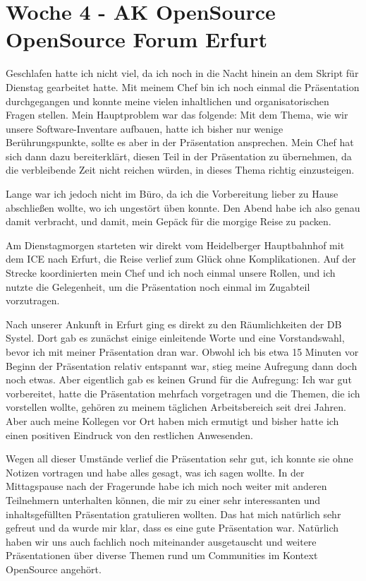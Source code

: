 \section{Woche 4 - AK OpenSource \headerand OpenSource Forum Erfurt} \label{sec:bericht-wo-4}


Geschlafen hatte ich nicht viel, da ich noch in die Nacht hinein an dem Skript für Dienstag gearbeitet hatte.
Mit meinem Chef bin ich noch einmal die Präsentation durchgegangen und konnte meine vielen inhaltlichen und organisatorischen Fragen stellen.
Mein Hauptproblem war das folgende: Mit dem Thema, wie wir unsere Software-Inventare aufbauen, hatte ich bisher nur wenige Berührungspunkte, sollte es aber in der Präsentation ansprechen.
Mein Chef hat sich dann dazu bereiterklärt, diesen Teil in der Präsentation zu übernehmen, da die verbleibende Zeit nicht reichen würden, in dieses Thema richtig einzusteigen.

Lange war ich jedoch nicht im Büro, da ich die Vorbereitung lieber zu Hause abschließen wollte, wo ich ungestört üben konnte.
Den Abend habe ich also genau damit verbracht, und damit, mein Gepäck für die morgige Reise zu packen.

Am Dienstagmorgen starteten wir direkt vom Heidelberger Hauptbahnhof mit dem ICE nach Erfurt, die Reise verlief zum Glück ohne Komplikationen.
Auf der Strecke koordinierten mein Chef und ich noch einmal unsere Rollen, und ich nutzte die Gelegenheit, um die Präsentation noch einmal im Zugabteil vorzutragen.

Nach unserer Ankunft in Erfurt ging es direkt zu den Räumlichkeiten der DB Systel.
Dort gab es zunächst einige einleitende Worte und eine Vorstandswahl, bevor ich mit meiner Präsentation dran war.
Obwohl ich bis etwa 15 Minuten vor Beginn der Präsentation relativ entspannt war, stieg meine Aufregung dann doch noch etwas.
Aber eigentlich gab es keinen Grund für die Aufregung:
Ich war gut vorbereitet, hatte die Präsentation mehrfach vorgetragen und die Themen, die ich vorstellen wollte, gehören zu meinem täglichen Arbeitsbereich seit drei Jahren.
Aber auch meine Kollegen vor Ort haben mich ermutigt und bisher hatte ich einen positiven Eindruck von den restlichen Anwesenden.

Wegen all dieser Umstände verlief die Präsentation sehr gut, ich konnte sie ohne Notizen vortragen und habe alles gesagt, was ich sagen wollte.
In der Mittagspause nach der Fragerunde habe ich mich noch weiter mit anderen Teilnehmern unterhalten können, die mir zu einer sehr interessanten und inhaltsgefüllten Präsentation gratulieren wollten.
Das hat mich natürlich sehr gefreut und da wurde mir klar, dass es eine gute Präsentation war.
Natürlich haben wir uns auch fachlich noch miteinander ausgetauscht und weitere Präsentationen über diverse Themen rund um Communities im Kontext OpenSource angehört.

